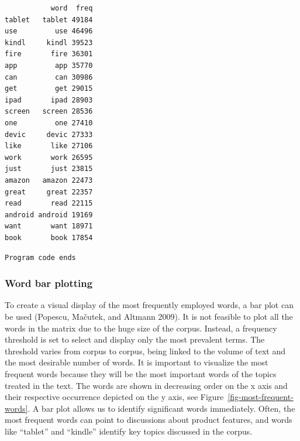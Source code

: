 \begin{Shaded}
\begin{Highlighting}[]

\OtherTok{\textless{}{-}} 

\OtherTok{\textless{}{-}} \NormalTok{)}

\OtherTok{\textless{}{-}} \NormalTok{(}\NormalTok{)}
\OtherTok{\textless{}{-}} \NormalTok{(} 

\NormalTok{)}
\end{Highlighting}
\end{Shaded}

\begin{verbatim}
           word  freq
tablet   tablet 49184
use         use 46496
kindl     kindl 39523
fire       fire 36301
app         app 35770
can         can 30986
get         get 29015
ipad       ipad 28903
screen   screen 28536
one         one 27410
devic     devic 27333
like       like 27106
work       work 26595
just       just 23815
amazon   amazon 22473
great     great 22357
read       read 22115
android android 19169
want       want 18971
book       book 17854
\end{verbatim}

\texttt{Program\ code\ ends}

\subsubsection{Word bar plotting}\label{word-barplot}

To create a visual display of the most frequently employed words, a bar
plot can be used (Popescu, Mačutek, and Altmann 2009).
It is not feasible to plot all the words in the matrix due to the huge
size of the corpus. Instead, a frequency threshold is set to select
and display only the most prevalent terms. The threshold varies from
corpus to corpus, being linked to the volume of text and the most desirable number
of words. It is important to visualize the most frequent
words because they will be the most important words of the topics
treated in the text. The
words are shown in decreasing order on the x axis and their respective
occurrence depicted on the y axis, see
Figure~\ref{fig-most-frequent-words}. A bar plot allows us to identify
significant words immediately. Often, the most frequent words can point to
discussions about product features, and words like ``tablet'' and
``kindle'' identify key topics discussed in the corpus.

